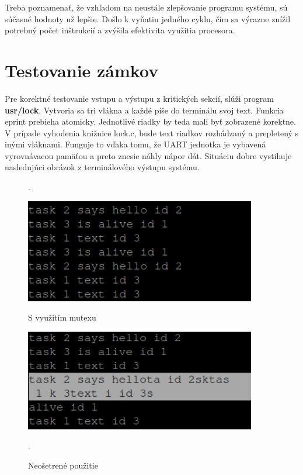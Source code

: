 Treba poznamenať, že vzhľadom na neustále zlepšovanie programu systému, sú súčasné hodnoty už lepšie. Došlo k vyňatiu jedného cyklu, čím sa výrazne znížil potrebný počet inštrukcií a zvýšila efektivita využitia procesora.

\newpage
\section {Testovanie zámkov}

Pre korektné testovanie vstupu a výstupu z kritických sekcií, slúži program \textbf{usr/lock}. Vytvoria sa tri vlákna a každé píše do terminálu svoj text. Funkcia eprint prebieha atomicky. Jednotlivé riadky by teda mali byť zobrazené korektne. V prípade vyhodenia knižnice lock.c, bude text riadkov rozhádzaný a prepletený s inými vláknami. Funguje to vďaka tomu, že UART jednotka je vybavená vyrovnávacou pamäťou a preto znesie náhly nápor dát. Situáciu dobre vystihuje nasledujúci obrázok z terminálového výstupu systému.


\begin{figure}[ht]
\phantom.\hfill
%
\begin{minipage}{0.45\linewidth}
\begin{center}
\includegraphics[width=0.9\textwidth]{images/atomic_.png}
\caption{S využitím mutexu}
\label{obrL1}
\end{center}
\end{minipage}
%
\hfill 
%
\begin{minipage}{0.45\linewidth}
\begin{center}
\includegraphics[width=0.9\textwidth]{images/no_atomic_.png}
\caption{Neošetrené použitie}
\label{obrP1}
\end{center}
\end{minipage}
%
\hfill\phantom.
\end{figure}


